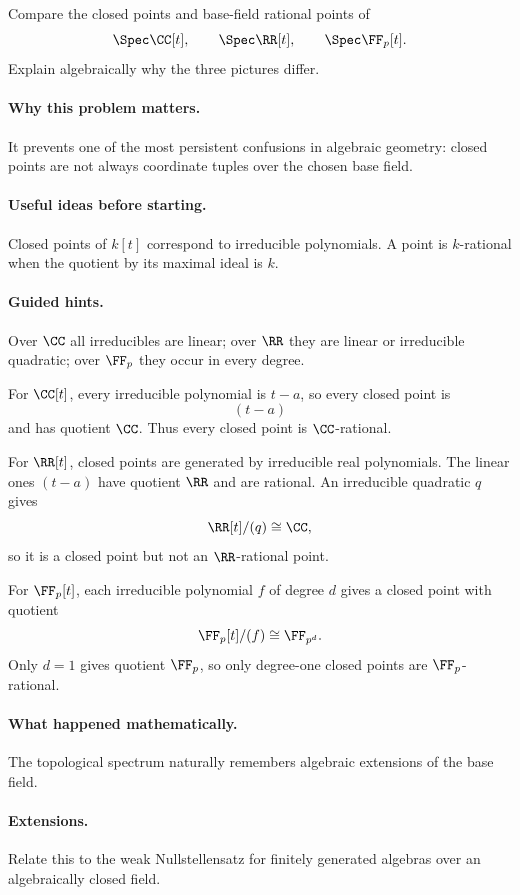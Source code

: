 \begin{problem}
Compare the closed points and base-field rational points of
\[
\Spec\CC[t],\qquad
\Spec\RR[t],\qquad
\Spec\FF_p[t].
\]
Explain algebraically why the three pictures differ.
\end{problem}

\paragraph{Why this problem matters.}
It prevents one of the most persistent confusions in algebraic geometry: closed points are
not always coordinate tuples over the chosen base field.

\paragraph{Useful ideas before starting.}
Closed points of $k[t]$ correspond to irreducible polynomials.  A point is $k$-rational
when the quotient by its maximal ideal is $k$.

\paragraph{Guided hints.}
Over $\CC$ all irreducibles are linear; over $\RR$ they are linear or irreducible
quadratic; over $\FF_p$ they occur in every degree.

\begin{solution}
For $\CC[t]$, every irreducible polynomial is $t-a$, so every closed point is
\[
(t-a)
\]
and has quotient $\CC$.  Thus every closed point is $\CC$-rational.

For $\RR[t]$, closed points are generated by irreducible real polynomials.  The linear
ones $(t-a)$ have quotient $\RR$ and are rational.  An irreducible quadratic $q$ gives
\[
\RR[t]/(q)\cong\CC,
\]
so it is a closed point but not an $\RR$-rational point.

For $\FF_p[t]$, each irreducible polynomial $f$ of degree $d$ gives a closed point with
quotient
\[
\FF_p[t]/(f)\cong\FF_{p^d}.
\]
Only $d=1$ gives quotient $\FF_p$, so only degree-one closed points are
$\FF_p$-rational.
\end{solution}

\paragraph{What happened mathematically.}
The topological spectrum naturally remembers algebraic extensions of the base field.

\paragraph{Extensions.}
Relate this to the weak Nullstellensatz for finitely generated algebras over an
algebraically closed field.
